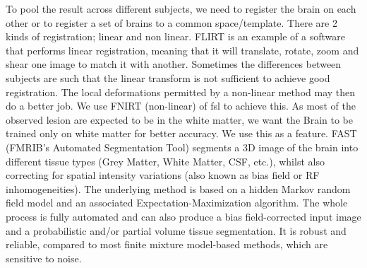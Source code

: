 \documentclass{article} %
\begin{document}
To pool the result across different subjects, we need to register the brain on each other or to register a set of brains to a common space/template. There are 2 kinds of registration; linear and non linear. FLIRT is an example of a software that performs linear registration, meaning that it will translate, rotate, zoom and shear one image to match it with another. Sometimes the differences between subjects are such that the linear transform is not sufficient to achieve good registration. The local deformations permitted by a non-linear method may then do a better job. 
We use FNIRT (non-linear) \cite{fnirt} of fsl\cite{fsl1}\cite{fsl2}\cite{fsl3} to achieve this. As most of the observed lesion are expected to be in the white matter, we want the Brain to be trained only on white matter for better accuracy. We use this as a feature. FAST \cite{fast} (FMRIB's Automated Segmentation Tool) segments a 3D image of the brain into different tissue types (Grey Matter, White Matter, CSF, etc.), whilst also correcting for spatial intensity variations (also known as bias field or RF inhomogeneities). The underlying method is based on a hidden Markov random field model and an associated Expectation-Maximization algorithm. The whole process is fully automated and can also produce a bias field-corrected input image and a probabilistic and/or partial volume tissue segmentation. It is robust and reliable, compared to most finite mixture model-based methods, which are sensitive to noise. 
\end{document}
